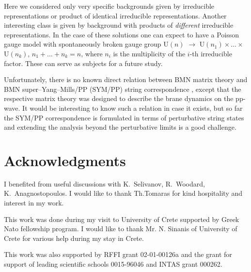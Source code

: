 \documentclass[a4paper]{article}
\begin{document}
Here we considered only very specific backgrounds given by
irreducible representations or product of identical irreducible
representations. Another interesting class is given by background
with products of \emph{different} irreducible representations. In
the case of these solutions one can expect to have a Poisson gauge
model with spontaneously broken gauge group U$(n)$ $\to$
U$(n_1)\times\dots\times$U$(n_k)$, $n_1+\dots+n_k=n$, where $n_i$
is the multiplicity of the $i$-th irreducible factor. These can
serve as subjects for a future study.

Unfortunately, there is no known direct relation between BMN
matrix theory and BMN super--Yang--Mills/PP (SYM/PP) string
correspondence \cite{Berenstein:2002jq}, except that the
respective matrix theory was designed to describe the brane
dynamics on the pp-wave. It would be interesting to know such a
relation in case it exists, but so far the SYM/PP correspondence
is formulated in terms of perturbative string states and extending
the analysis beyond the perturbative limits is a good challenge.

\section*{Acknowledgments}
I benefited from useful discussions with K.~Selivanov, R.~Woodard,
K.~Anagnostopoulos. I would like to thank Th.Tomaras for kind
hospitality and interest in my work.

This work was done during my visit to University of Crete
supported by Greek Nato fellowship program. I would like to thank
Mr. N. Sinanis of University of Crete for various help during my
stay in Crete.

This work was also supported by RFFI grant
02-01-00126a and the grant for support of leading scientific schools
0015-96046 and INTAS grant 000262.
\end{document}
